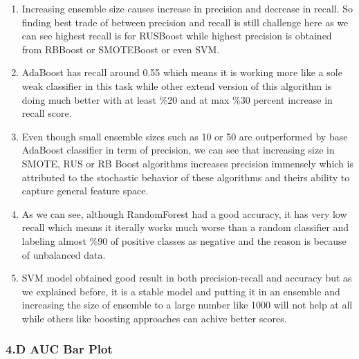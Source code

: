 \documentclass[11pt]{article}
\providecommand{\tightlist}{%
      \setlength{\itemsep}{0pt}\setlength{\parskip}{0pt}}
\begin{document}
\begin{enumerate}
\def\labelenumi{\arabic{enumi}.}
\tightlist
\item
  Increasing ensemble size causes increase in precision and decrease in
  recall. So finding best trade of between precision and recall is still
  challenge here as we can see highest recall is for RUSBoost while
  highest precision is obtained from RBBoost or SMOTEBoost or even SVM.
\item
  AdaBoost has recall around 0.55 which means it is working more like a
  sole weak classifier in this task while other extend version of this
  algorithm is doing much better with at least \%20 and at max \%30
  percent increase in recall score.
\item
  Even though small ensemble sizes such as 10 or 50 are outperformed by
  base AdaBoost classifier in term of precision, we can see that
  increasing size in SMOTE, RUS or RB Boost algorithms increases
  precision immensely which is attributed to the stochastic behavior of
  these algorithms and theirs ability to capture general feature space.
\item
  As we can see, although RandomForest had a good accuracy, it has very
  low recall which means it iterally works much worse than a random
  classifier and labeling almost \%90 of positive classes as negative
  and the reason is because of unbalanced data.
\item
  SVM model obtained good result in both precision-recall and accuracy
  but as we explained before, it is a stable model and putting it in an
  ensemble and increasing the size of ensemble to a large number like
  1000 will not help at all while others like boosting approaches can
  achive better scores.
\end{enumerate}

    \hypertarget{d-auc-bar-plot}{%
\subsubsection{4.D AUC Bar Plot}\label{d-auc-bar-plot}}
\end{document}
